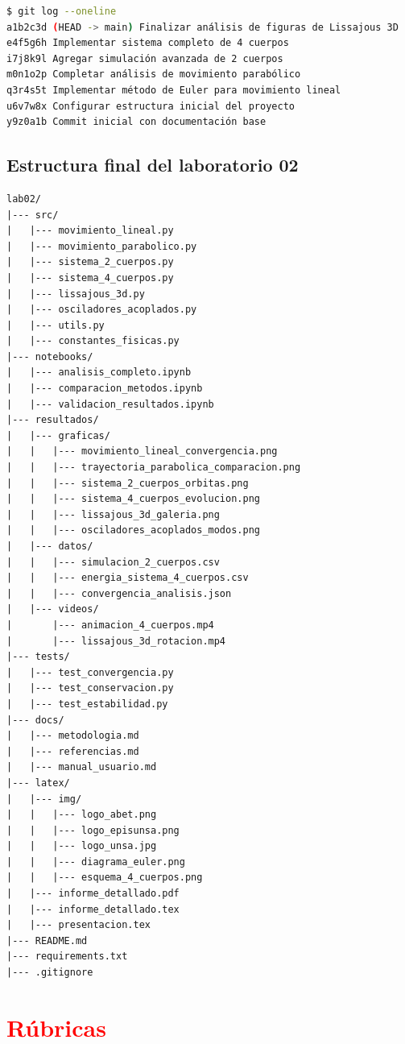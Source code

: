 \documentclass{article}
\begin{document}
	\begin{lstlisting}[language=bash, caption={Historial de commits del proyecto}]
$ git log --oneline
a1b2c3d (HEAD -> main) Finalizar análisis de figuras de Lissajous 3D
e4f5g6h Implementar sistema completo de 4 cuerpos
i7j8k9l Agregar simulación avanzada de 2 cuerpos
m0n1o2p Completar análisis de movimiento parabólico
q3r4s5t Implementar método de Euler para movimiento lineal
u6v7w8x Configurar estructura inicial del proyecto
y9z0a1b Commit inicial con documentación base
	\end{lstlisting}
	
	\subsection{Estructura final del laboratorio 02}
	
	\begin{lstlisting}[style=ascii-tree]
lab02/
|--- src/
|   |--- movimiento_lineal.py
|   |--- movimiento_parabolico.py
|   |--- sistema_2_cuerpos.py
|   |--- sistema_4_cuerpos.py
|   |--- lissajous_3d.py
|   |--- osciladores_acoplados.py
|   |--- utils.py
|   |--- constantes_fisicas.py
|--- notebooks/
|   |--- analisis_completo.ipynb
|   |--- comparacion_metodos.ipynb
|   |--- validacion_resultados.ipynb
|--- resultados/
|   |--- graficas/
|   |   |--- movimiento_lineal_convergencia.png
|   |   |--- trayectoria_parabolica_comparacion.png
|   |   |--- sistema_2_cuerpos_orbitas.png
|   |   |--- sistema_4_cuerpos_evolucion.png
|   |   |--- lissajous_3d_galeria.png
|   |   |--- osciladores_acoplados_modos.png
|   |--- datos/
|   |   |--- simulacion_2_cuerpos.csv
|   |   |--- energia_sistema_4_cuerpos.csv
|   |   |--- convergencia_analisis.json
|   |--- videos/
|       |--- animacion_4_cuerpos.mp4
|       |--- lissajous_3d_rotacion.mp4
|--- tests/
|   |--- test_convergencia.py
|   |--- test_conservacion.py
|   |--- test_estabilidad.py
|--- docs/
|   |--- metodologia.md
|   |--- referencias.md
|   |--- manual_usuario.md
|--- latex/
|   |--- img/
|   |   |--- logo_abet.png
|   |   |--- logo_episunsa.png
|   |   |--- logo_unsa.jpg
|   |   |--- diagrama_euler.png
|   |   |--- esquema_4_cuerpos.png
|   |--- informe_detallado.pdf
|   |--- informe_detallado.tex
|   |--- presentacion.tex
|--- README.md
|--- requirements.txt
|--- .gitignore
	\end{lstlisting}

	\section{\textcolor{red}{Rúbricas}}
	
\end{document}

